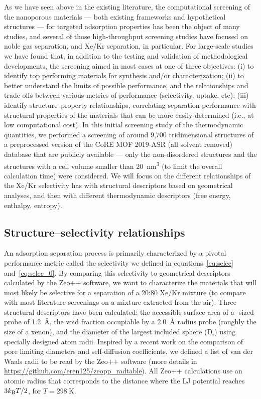 \documentclass[main.tex]{subfiles}
\begin{document}
As we have seen above in the existing literature, the computational screening of the nanoporous materials --- both existing frameworks and hypothetical structures --- for targeted adsorption properties has been the object of many studies, and several of those high-throughput screening studies have focused on noble gas separation, and Xe/Kr separation, in particular. For large-scale studies we have found that, in addition to the testing and validation of methodological developments, the screening aimed in most cases at one of three objectives: (i) to identify top performing materials for synthesis and/or characterization; (ii) to better understand the limits of possible performance, and the relationships and trade-offs between various metrics of performance (selectivity, uptake, etc); (iii) identify structure--property relationships, correlating separation performance with structural properties of the materials that can be more easily determined (i.e., at low computational cost). In this initial screening study of the thermodynamic quantities, we performed a screening of around 9,700 tridimensional structures of a preprocessed version of the CoRE MOF 2019-ASR (all solvent removed) database that are publicly available --- only the non-disordered structures and the structures with a cell volume smaller than \SI{20}{\nano\meter\cubed} (to limit the overall calculation time) were considered. We will focus on the different relationships of the Xe/Kr selectivity has with structural descriptors based on geometrical analyses, and then with different thermodynamic descriptors (free energy, enthalpy, entropy). 

\subsection{Structure--selectivity relationships}\label{sct:geometry}

An adsorption separation process is primarily characterized by a pivotal performance metric called the selectivity we defined in equations~\ref{eq:selec} and~\ref{eq:selec_0}. By comparing this selectivity to geometrical descriptors calculated by the Zeo++ software,\autocite{Zeo++} we want to characterize the materials that will most likely be selective for a separation of a 20:80 Xe/Kr mixture (to compare with most literature screenings on a mixture extracted from the air). Three structural descriptors have been calculated: the accessible surface area of a -sized probe of \SI{1.2}{\angstrom}, the void fraction occupiable by a \SI{2.0}{\angstrom} radius probe (roughly the size of a xenon),\autocite{vol_Ongari2017} and the diameter of the largest included sphere (D$_i$) using specially designed atom radii. Inspired by a recent work on the comparison of pore limiting diameters and self-diffusion coefficients,\autocite{Hung_2021} we defined a list of van der Waals radii to be read by the Zeo++ software (more details in \url{https://github.com/eren125/zeopp_radtable}). All Zeo++ calculations use an atomic radius that corresponds to the distance where the LJ potential reaches $3 k_{\text{B}} T/2$, for $T = \SI{298}{\kelvin}$.
\end{document}
